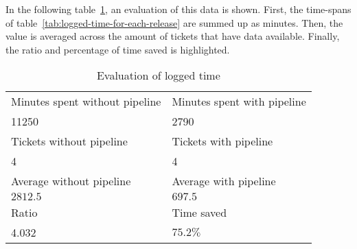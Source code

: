 In the following table\ \ref{tab:evaluation-of-logged-time}, an evaluation of this data is shown.
First, the time-spans of table\ \ref{tab:logged-time-for-each-release} are summed up as minutes.
Then, the value is averaged across the amount of tickets that have data available.
Finally, the ratio and percentage of time saved is highlighted.

\begin{table}[H]
    \centering
    \caption{Evaluation of logged time}
    \label{tab:evaluation-of-logged-time}
    \begin{tabular}{l|l}
        Minutes spent without pipeline & Minutes spent with pipeline \\
        11250 & 2790 \\
        \hline
        Tickets without pipeline & Tickets with pipeline \\
        4 & 4 \\
        \hline
        Average without pipeline & Average with pipeline \\
        $2812.5$ & $697.5$ \\
        \hline
        Ratio & Time saved \\
        4.032 & $75.2 \%$ \\
    \end{tabular}
\end{table}
